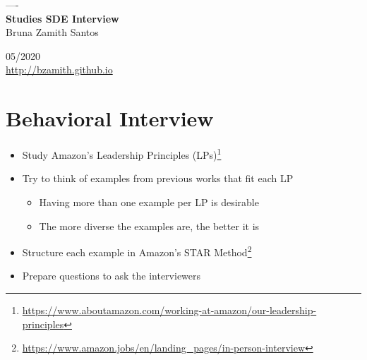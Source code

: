 \documentclass[a4paper, 11.25pt]{article}
\begin{document}

\begin{titlepage}
	\begin{center}
	    \large{----}\\
	    \vspace{250pt}
		\huge{\textbf{Studies SDE Interview}}\\
		\vspace{15pt}
		\large{Bruna Zamith Santos}\\
		\vspace{3,5cm}
	\end{center}
	
	\begin{center}
		\vspace{\fill}
			 05/2020\\
		    \url{http://bzamith.github.io}
	\end{center}
\end{titlepage}

\onehalfspace

\newpage
\tableofcontents
\thispagestyle{empty}

\newpage
{}
\section{Behavioral Interview}
\begin{itemize}
    \item Study Amazon's Leadership Principles (LPs)\footnote{\url{https://www.aboutamazon.com/working-at-amazon/our-leadership-principles}}
    \item Try to think of examples from previous works that fit each LP
    \begin{itemize}
        \item Having more than one example per LP is desirable
        \item The more diverse the examples are, the better it is
    \end{itemize}
    \item Structure each example in Amazon's STAR Method\footnote{\url{https://www.amazon.jobs/en/landing_pages/in-person-interview}}
    \item Prepare questions to ask the interviewers
\end{itemize}
\end{document}

